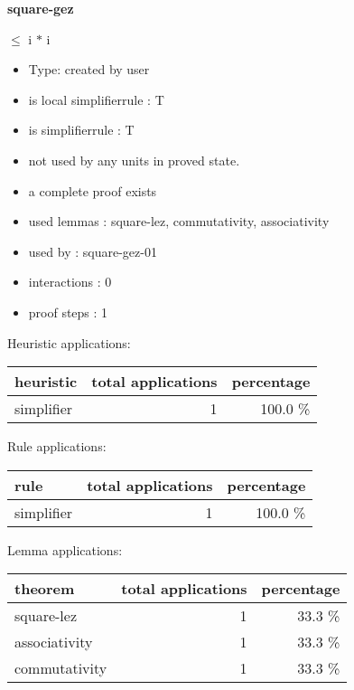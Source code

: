 \documentclass[a4paper]{article}
\begin{document}
{\LARGE\bf square-gez}\label{lemma-square-gez}

\medskip

  $\le$ i $*$ i

\begin{itemize}

\item Type: created by user

\item is local simplifierrule : T
\item is simplifierrule : T
\item not used by any units in proved state.
\item       a complete proof exists
\item       used lemmas  : square-lez, commutativity, associativity
\item       used by      : square-gez-01
\item       interactions : 0
\item       proof steps  : 1
\end{itemize}

\medskip


Heuristic applications:

\begin{supertabular}{l|r|r}
heuristic	& total applications & percentage \\ \hline
simplifier & 1 & 100.0 \% \\

\end{supertabular}

Rule applications:

\begin{supertabular}{l|r|r}
rule	        & total applications & percentage \\ \hline
simplifier & 1 & 100.0 \% \\

\end{supertabular}

Lemma applications:

\begin{supertabular}{l|r|r}
theorem	        & total applications & percentage \\ \hline
square-lez & 1 & 33.3 \% \\
associativity & 1 & 33.3 \% \\
commutativity & 1 & 33.3 \% \\

\end{supertabular}
\end{document}
